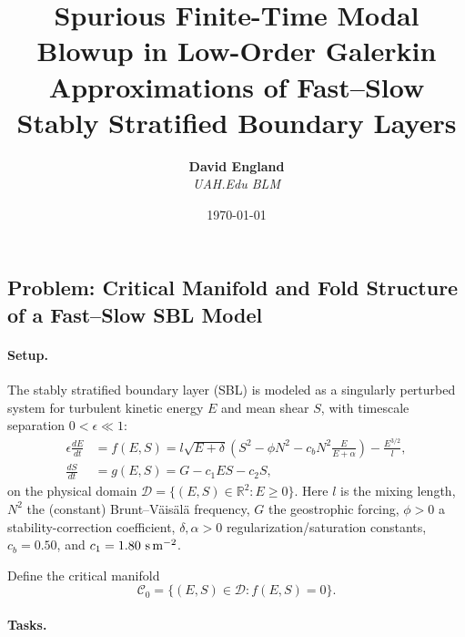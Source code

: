 \documentclass[11pt,fleqn]{article}
\title{\textbf{Spurious Finite-Time Modal Blowup in Low-Order Galerkin Approximations of Fast--Slow Stably Stratified Boundary Layers}}
\author{\textbf{David England} \\ \textit{UAH.Edu BLM}}
\date{\today}
\begin{document}
\subsection{Problem: Critical Manifold and Fold Structure of a Fast--Slow SBL Model}

\paragraph{Setup.} The stably stratified boundary layer (SBL) is modeled as a singularly perturbed system for turbulent kinetic energy $E$ and mean shear $S$, with timescale separation $0 < \epsilon \ll 1$:
\begin{align}
\epsilon \frac{dE}{dt} &= f(E,S) = l \sqrt{E + \delta} \left( S^2 - \phi N^2 - c_b N^2 \frac{E}{E + \alpha} \right) - \frac{E^{3/2}}{l}, \label{eq:fast_tke} \\
\frac{dS}{dt} &= g(E,S) = G - c_1 E S - c_2 S, \label{eq:slow_shear}
\end{align}
on the physical domain $\mathcal{D} = \{(E,S) \in \mathbb{R}^2 : E \ge 0\}$. Here $l$ is the mixing length, $N^2$ the (constant) Brunt--Väisälä frequency, $G$ the geostrophic forcing, $\phi > 0$ a stability-correction coefficient, $\delta, \alpha > 0$ regularization/saturation constants, $c_b = 0.50$, and $c_1 = 1.80\ \text{s\,m}^{-2}$.

Define the critical manifold
\begin{equation}
\mathcal{C}_0 = \{(E,S) \in \mathcal{D} : f(E,S) = 0\}.
\end{equation}

\paragraph{Tasks.}
\end{document}
